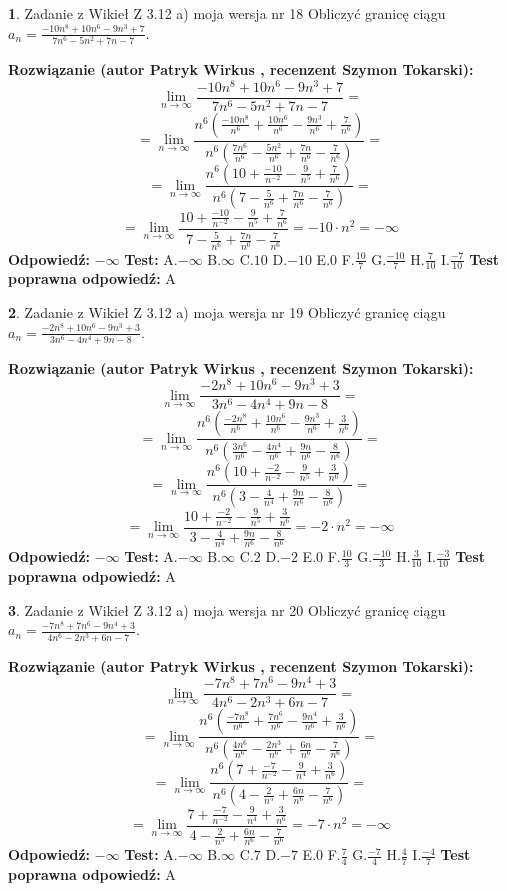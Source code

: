 \documentclass[12pt, a4paper]{article}
\theoremstyle{definition} %
\newtheorem{zad}{}
\newcommand{\zadStart}[1]{\begin{zad}#1\newline}
\newcommand{\zadStop}{\end{zad}}
\newcommand{\rozwStart}[2]{\noindent \textbf{Rozwiązanie (autor #1 , recenzent #2): }\newline}
\newcommand{\rozwStop}{\newline}
\newcommand{\odpStart}{\noindent \textbf{Odpowiedź:}\newline}
\newcommand{\odpStop}{\newline}
\newcommand{\testStart}{\noindent \textbf{Test:}\newline}
\newcommand{\testStop}{\newline}
\newcommand{\kluczStart}{\noindent \textbf{Test poprawna odpowiedź:}\newline}
\newcommand{\kluczStop}{\newline}
\begin{document}
\zadStart{Zadanie z Wikieł Z 3.12 a) moja wersja nr 18}
Obliczyć granicę ciągu $a_{n}=\frac{-10n^{8}+10n^{6}-9n^{3}+7}{7n^{6}-5n^{2}+7n-7}$.
\zadStop
\rozwStart{Patryk Wirkus}{Szymon Tokarski}
$$\lim\limits_{n\to\infty}\frac{-10n^{8}+10n^{6}-9n^{3}+7}{7n^{6}-5n^{2}+7n-7}=$$
$$=\lim\limits_{n\to\infty}\frac{n^{6}\left(\frac{-10n^{8}}{n^{6}}+\frac{10n^{6}}{n^{6}}-\frac{9n^{3}}{n^{6}}+\frac{7}{n^{6}}\right)}{n^{6}\left(\frac{7n^{6}}{n^{6}}-\frac{5n^{2}}{n^{6}}+\frac{7n}{n^{6}}-\frac{7}{n^{6}}\right)}=$$
$$=\lim\limits_{n\to\infty}\frac{n^{6}\left(10+\frac{-10}{n^{-2}}-\frac{9}{n^{5}}+\frac{7}{n^{6}}\right)}
{n^{6}\left(7-\frac{5}{n^{6}}+\frac{7n}{n^{6}}-\frac{7}{n^{6}}\right)}=$$
$$=\lim\limits_{n\to\infty}\frac{10+\frac{-10}{n^{-2}}-\frac{9}{n^{5}}+\frac{7}{n^{6}}}{7-\frac{5}{n^{6}}+\frac{7n}{n^{6}}-\frac{7}{n^{6}}}=-10\cdot n^{2} = -\infty$$
\rozwStop
\odpStart
$-\infty$
\odpStop
\testStart
A.$-\infty$
B.$\infty$
C.$10$
D.$-10$
E.$0$
F.$\frac{10}{7}$
G.$\frac{-10}{7}$
H.$\frac{7}{10}$
I.$\frac{-7}{10}$
\testStop
\kluczStart
A
\kluczStop



\zadStart{Zadanie z Wikieł Z 3.12 a) moja wersja nr 19}
Obliczyć granicę ciągu $a_{n}=\frac{-2n^{8}+10n^{6}-9n^{3}+3}{3n^{6}-4n^{4}+9n-8}$.
\zadStop
\rozwStart{Patryk Wirkus}{Szymon Tokarski}
$$\lim\limits_{n\to\infty}\frac{-2n^{8}+10n^{6}-9n^{3}+3}{3n^{6}-4n^{4}+9n-8}=$$
$$=\lim\limits_{n\to\infty}\frac{n^{6}\left(\frac{-2n^{8}}{n^{6}}+\frac{10n^{6}}{n^{6}}-\frac{9n^{3}}{n^{6}}+\frac{3}{n^{6}}\right)}{n^{6}\left(\frac{3n^{6}}{n^{6}}-\frac{4n^{4}}{n^{6}}+\frac{9n}{n^{6}}-\frac{8}{n^{6}}\right)}=$$
$$=\lim\limits_{n\to\infty}\frac{n^{6}\left(10+\frac{-2}{n^{-2}}-\frac{9}{n^{5}}+\frac{3}{n^{6}}\right)}
{n^{6}\left(3-\frac{4}{n^{4}}+\frac{9n}{n^{6}}-\frac{8}{n^{6}}\right)}=$$
$$=\lim\limits_{n\to\infty}\frac{10+\frac{-2}{n^{-2}}-\frac{9}{n^{5}}+\frac{3}{n^{6}}}{3-\frac{4}{n^{4}}+\frac{9n}{n^{6}}-\frac{8}{n^{6}}}=-2\cdot n^{2} = -\infty$$
\rozwStop
\odpStart
$-\infty$
\odpStop
\testStart
A.$-\infty$
B.$\infty$
C.$2$
D.$-2$
E.$0$
F.$\frac{10}{3}$
G.$\frac{-10}{3}$
H.$\frac{3}{10}$
I.$\frac{-3}{10}$
\testStop
\kluczStart
A
\kluczStop



\zadStart{Zadanie z Wikieł Z 3.12 a) moja wersja nr 20}
Obliczyć granicę ciągu $a_{n}=\frac{-7n^{8}+7n^{6}-9n^{4}+3}{4n^{6}-2n^{3}+6n-7}$.
\zadStop
\rozwStart{Patryk Wirkus}{Szymon Tokarski}
$$\lim\limits_{n\to\infty}\frac{-7n^{8}+7n^{6}-9n^{4}+3}{4n^{6}-2n^{3}+6n-7}=$$
$$=\lim\limits_{n\to\infty}\frac{n^{6}\left(\frac{-7n^{8}}{n^{6}}+\frac{7n^{6}}{n^{6}}-\frac{9n^{4}}{n^{6}}+\frac{3}{n^{6}}\right)}{n^{6}\left(\frac{4n^{6}}{n^{6}}-\frac{2n^{3}}{n^{6}}+\frac{6n}{n^{6}}-\frac{7}{n^{6}}\right)}=$$
$$=\lim\limits_{n\to\infty}\frac{n^{6}\left(7+\frac{-7}{n^{-2}}-\frac{9}{n^{4}}+\frac{3}{n^{6}}\right)}
{n^{6}\left(4-\frac{2}{n^{5}}+\frac{6n}{n^{6}}-\frac{7}{n^{6}}\right)}=$$
$$=\lim\limits_{n\to\infty}\frac{7+\frac{-7}{n^{-2}}-\frac{9}{n^{4}}+\frac{3}{n^{6}}}{4-\frac{2}{n^{5}}+\frac{6n}{n^{6}}-\frac{7}{n^{6}}}=-7\cdot n^{2} = -\infty$$
\rozwStop
\odpStart
$-\infty$
\odpStop
\testStart
A.$-\infty$
B.$\infty$
C.$7$
D.$-7$
E.$0$
F.$\frac{7}{4}$
G.$\frac{-7}{4}$
H.$\frac{4}{7}$
I.$\frac{-4}{7}$
\testStop
\kluczStart
A
\kluczStop
\end{document}
